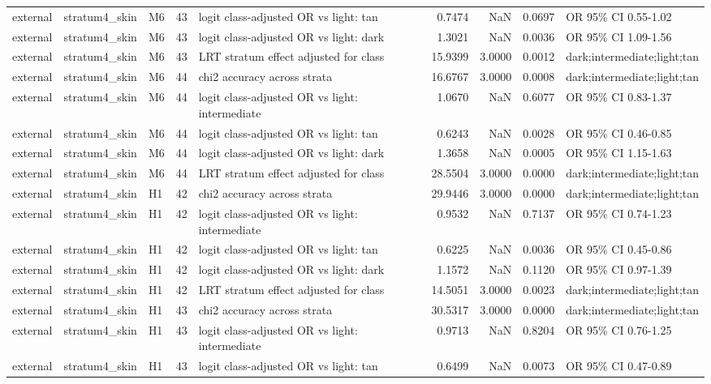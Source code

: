 \begin{tabular}{lllrlrrrl}
external & stratum4\_skin & M6 & 43 & logit class-adjusted OR vs light: tan & 0.7474 & NaN & 0.0697 & OR 95\% CI 0.55-1.02 \\
external & stratum4\_skin & M6 & 43 & logit class-adjusted OR vs light: dark & 1.3021 & NaN & 0.0036 & OR 95\% CI 1.09-1.56 \\
external & stratum4\_skin & M6 & 43 & LRT stratum effect adjusted for class & 15.9399 & 3.0000 & 0.0012 & dark;intermediate;light;tan \\
external & stratum4\_skin & M6 & 44 & chi2 accuracy across strata & 16.6767 & 3.0000 & 0.0008 & dark;intermediate;light;tan \\
external & stratum4\_skin & M6 & 44 & logit class-adjusted OR vs light: intermediate & 1.0670 & NaN & 0.6077 & OR 95\% CI 0.83-1.37 \\
external & stratum4\_skin & M6 & 44 & logit class-adjusted OR vs light: tan & 0.6243 & NaN & 0.0028 & OR 95\% CI 0.46-0.85 \\
external & stratum4\_skin & M6 & 44 & logit class-adjusted OR vs light: dark & 1.3658 & NaN & 0.0005 & OR 95\% CI 1.15-1.63 \\
external & stratum4\_skin & M6 & 44 & LRT stratum effect adjusted for class & 28.5504 & 3.0000 & 0.0000 & dark;intermediate;light;tan \\
external & stratum4\_skin & H1 & 42 & chi2 accuracy across strata & 29.9446 & 3.0000 & 0.0000 & dark;intermediate;light;tan \\
external & stratum4\_skin & H1 & 42 & logit class-adjusted OR vs light: intermediate & 0.9532 & NaN & 0.7137 & OR 95\% CI 0.74-1.23 \\
external & stratum4\_skin & H1 & 42 & logit class-adjusted OR vs light: tan & 0.6225 & NaN & 0.0036 & OR 95\% CI 0.45-0.86 \\
external & stratum4\_skin & H1 & 42 & logit class-adjusted OR vs light: dark & 1.1572 & NaN & 0.1120 & OR 95\% CI 0.97-1.39 \\
external & stratum4\_skin & H1 & 42 & LRT stratum effect adjusted for class & 14.5051 & 3.0000 & 0.0023 & dark;intermediate;light;tan \\
external & stratum4\_skin & H1 & 43 & chi2 accuracy across strata & 30.5317 & 3.0000 & 0.0000 & dark;intermediate;light;tan \\
external & stratum4\_skin & H1 & 43 & logit class-adjusted OR vs light: intermediate & 0.9713 & NaN & 0.8204 & OR 95\% CI 0.76-1.25 \\
external & stratum4\_skin & H1 & 43 & logit class-adjusted OR vs light: tan & 0.6499 & NaN & 0.0073 & OR 95\% CI 0.47-0.89 \\

\end{tabular}
